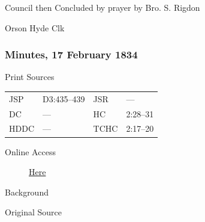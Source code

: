 					Council then Concluded by prayer by Bro. S. Rigdon
					
					\begin{tightright}
					Orson Hyde Clk
					\end{tightright}
					
		\subsubsection{Minutes, 17 February 1834}
			\label{EMS-1834-JS-17-FEB-1834}
			
			\begin{description}
					\item[Print Sources]
				\end{description}

					\begin{tabular}{p{0.5in}p{1in}p{0.5in}p{1in}}
					JSP	 	& D3:435--439		& JSR 		& --- \\
					DC	 	& --- 		& HC 		& 2:28--31 \\
					HDDC 	& ---		& TCHC 		& 2:17--20 \\
					\end{tabular}
				
				\begin{description}
					\item[Online Access] \href{https://www.josephsmithpapers.org/paper-summary/minutes-17-february-1834/1}{Here}
				\end{description}
				
				\begin{description}
					\item[Background]
				\end{description}
				
				
				\begin{description}
					\item[Original Source]
				\end{description}
				
